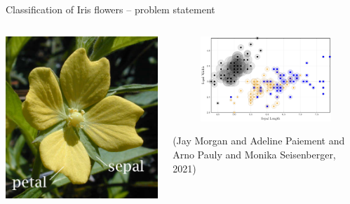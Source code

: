 \documentclass[smaller]{beamer}
\begin{document}
\begin{frame}[label={sec:orge9d0460}]{Classification of Iris flowers -- problem statement}
\begin{columns}
\begin{column}{0.3\columnwidth}
\begin{center}
\includegraphics[width=1.0\textwidth]{images/Petal-sepal.jpg}
\end{center}
\end{column}

\begin{column}{0.7\columnwidth}
\begin{figure}
    \centering
    \includegraphics[width=\textwidth]{images/iris-eps.png}
    \label{fig:iris}
\end{figure}

(Jay Morgan and Adeline Paiement and Arno Pauly and Monika Seisenberger, 2021)
\end{column}
\end{columns}
\end{frame}
\end{document}
